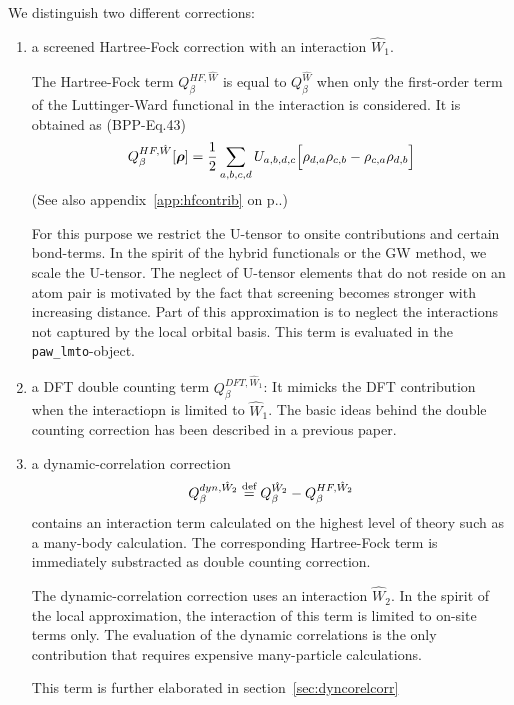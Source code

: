 \documentclass[11pt,a4paper]{report}
\begin{document}
We distinguish two different corrections:
\begin{enumerate}
\item a screened Hartree-Fock correction with an interaction
  $\hat{W}_1$. 

  The Hartree-Fock term $Q^{HF,\hat{W}}_{\beta}$ is equal to
  $Q^{\hat{W}}_\beta$ when only the first-order term of the
  Luttinger-Ward functional in the interaction is considered.  It is
  obtained as (BPP-Eq.43)
  \begin{eqnarray}
  Q_{\beta}^{HF,\hat{W}}[\bm{\rho}]
  =\frac{1}{2}\sum_{a,b,c,d}U_{a,b,d,c}
   \Bigl[\rho_{d,a}\rho_{c,b}-\rho_{c,a}\rho_{d,b}\Bigr]
  \end{eqnarray}
  (See also appendix~\ref{app:hfcontrib} on p.\pageref{app:hfcontrib}.)

  For this purpose we restrict the U-tensor to onsite contributions
  and certain bond-terms. In the spirit of the hybrid functionals or
  the GW method, we scale the U-tensor. The neglect of U-tensor
  elements that do not reside on an atom pair is motivated by the fact
  that screening becomes stronger with increasing distance. Part of
  this approximation is to neglect the interactions not captured by
  the local orbital basis. This term is evaluated in the
  \verb|paw_lmto|-object.
%
\item a DFT double counting term $Q^{DFT,\hat{W}_1}_\beta$: It mimicks
  the DFT contribution when the interactiopn is limited to
  $\hat{W}_1$. The basic ideas behind the double counting correction
  has been described in a previous paper\cite{bloechl11_prb84_205101}.
%
\item a dynamic-correlation correction 
  \begin{eqnarray}
  Q^{dyn,\hat{W}_2}_\beta\stackrel{\text{def}}{=} Q^{\hat{W}_2}_\beta-Q^{HF,\hat{W}_2}_\beta
  \end{eqnarray}
  contains an interaction term calculated on the highest level of
  theory such as a many-body calculation. The corresponding
  Hartree-Fock term is immediately substracted as double counting
  correction.

  The dynamic-correlation correction uses an interaction
  $\hat{W}_2$. In the spirit of the local approximation, the
  interaction of this term is limited to on-site terms only. The
  evaluation of the dynamic correlations is the only contribution that
  requires expensive many-particle calculations.

  This term is further elaborated in section~\ref{sec:dyncorelcorr}
\end{enumerate}
\end{document}
